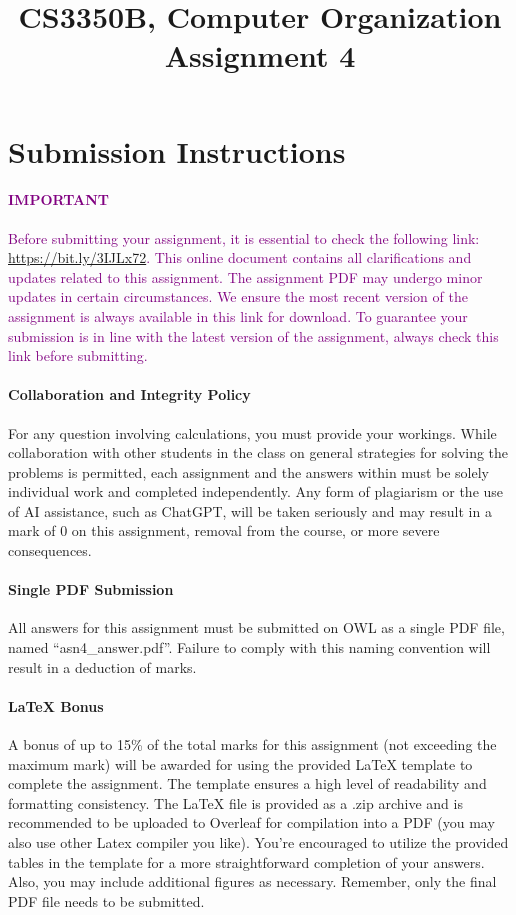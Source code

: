 \documentclass[12pt, a4paper]{article}
\title{CS3350B, Computer Organization\\
Assignment 4}
\author{}
\begin{document}
\maketitle
\thispagestyle{empty}


\section*{Submission Instructions}

\textcolor{purple}{
\paragraph{IMPORTANT} Before submitting your assignment, it is essential to check the following link: \href{https://bit.ly/3IJLx72}{https://bit.ly/3IJLx72}. This online document contains all clarifications and updates related to this assignment. The assignment PDF may undergo minor updates in certain circumstances. We ensure the most recent version of the assignment is always available in this link for download. To guarantee your submission is in line with the latest version of the assignment, always check this link before submitting.
}

\paragraph{Collaboration and Integrity Policy} For any question involving calculations, you must provide your workings. While collaboration with other students in the class on general strategies for solving the problems is permitted, each assignment and the answers within must be solely individual work and completed independently. Any form of plagiarism or the use of AI assistance, such as ChatGPT, will be taken seriously and may result in a mark of 0 on this assignment, removal from the course, or more severe consequences.


\paragraph{Single PDF Submission} All answers for this assignment must be submitted on OWL as a single PDF file, named ``asn4\_answer.pdf''. Failure to comply with this naming convention will result in a deduction of marks.

\paragraph{LaTeX Bonus} A bonus of up to 15\% of the total marks for this assignment (not exceeding the maximum mark) will be awarded for using the provided LaTeX template to complete the assignment. The template ensures a high level of readability and formatting consistency. The LaTeX file is provided as a .zip archive and is recommended to be uploaded to Overleaf for compilation into a PDF (you may also use other Latex compiler you like). You're encouraged to utilize the provided tables in the template for a more straightforward completion of your answers. Also, you may include additional figures as necessary. Remember, only the final PDF file needs to be submitted.
\end{document}
